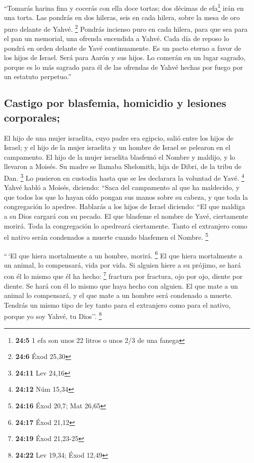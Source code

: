\begin{paracol}{2}
 ``Tomarás harina fina y cocerás con ella doce tortas; dos
décimas de efa\footnote{\textbf{24:5} 1 efa son unos 22 litros o unos
  2/3 de una fanega} irán en una torta.  Las pondrás en
dos hileras, seis en cada hilera, sobre la mesa de oro puro delante de
Yahvé. \footnote{\textbf{24:6} Éxod 25,30}  Pondrás
incienso puro en cada hilera, para que sea para el pan un memorial, una
ofrenda encendida a Yahvé.  Cada día de reposo lo pondrá
en orden delante de Yavé continuamente. Es un pacto eterno a favor de
los hijos de Israel.  Será para Aarón y sus hijos. Lo
comerán en un lugar sagrado, porque es lo más sagrado para él de las
ofrendas de Yahvé hechas por fuego por un estatuto perpetuo.''

\hypertarget{castigo-por-blasfemia-homicidio-y-lesiones-corporales}{%
\subsection{Castigo por blasfemia, homicidio y lesiones
corporales;}\label{castigo-por-blasfemia-homicidio-y-lesiones-corporales}}

 El hijo de una mujer israelita, cuyo padre era egipcio,
salió entre los hijos de Israel; y el hijo de la mujer israelita y un
hombre de Israel se pelearon en el campamento.  El hijo
de la mujer israelita blasfemó el Nombre y maldijo, y lo llevaron a
Moisés. Su madre se llamaba Shelomith, hija de Dibri, de la tribu de
Dan. \footnote{\textbf{24:11} Lev 24,16}  Lo pusieron en
custodia hasta que se les declarara la voluntad de Yavé. \footnote{\textbf{24:12}
  Núm 15,34}  Yahvé habló a Moisés, diciendo:
 ``Saca del campamento al que ha maldecido, y que todos
los que lo hayan oído pongan sus manos sobre su cabeza, y que toda la
congregación lo apedree.  Hablarás a los hijos de Israel
diciendo: ``El que maldiga a su Dios cargará con su pecado.
 El que blasfeme el nombre de Yavé, ciertamente morirá.
Toda la congregación lo apedreará ciertamente. Tanto el extranjero como
el nativo serán condenados a muerte cuando blasfemen el Nombre.
\footnote{\textbf{24:16} Éxod 20,7; Mat 26,65}

 ``\,`El que hiera mortalmente a un hombre, morirá.
\footnote{\textbf{24:17} Éxod 21,12}  El que hiera
mortalmente a un animal, lo compensará, vida por vida. 
Si alguien hiere a su prójimo, se hará con él lo mismo que él ha hecho:
\footnote{\textbf{24:19} Éxod 21,23-25}  fractura por
fractura, ojo por ojo, diente por diente. Se hará con él lo mismo que
haya hecho con alguien.  El que mate a un animal lo
compensará, y el que mate a un hombre será condenado a muerte.
 Tendrás un mismo tipo de ley tanto para el extranjero
como para el nativo, porque yo soy Yahvé, tu Dios''. \footnote{\textbf{24:22}
  Lev 19,34; Éxod 12,49}


\end{paracol}
